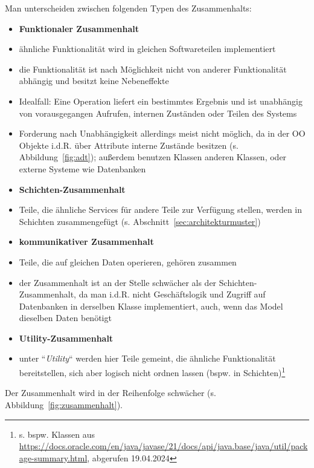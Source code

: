 Man unterscheiden zwischen folgenden Typen des Zusammenhalts:

\begin{itemize}
    \item \textbf{Funktionaler Zusammenhalt}
    \item[] ähnliche Funktionalität wird in gleichen Softwareteilen implementiert
    \item[] die Funktionalität ist nach Möglichkeit nicht von anderer Funktionalität abhängig und besitzt keine Nebeneffekte
    \item[] Idealfall: Eine Operation liefert ein bestimmtes Ergebnis und ist unabhängig von vorausgegangen Aufrufen, internen Zuständen oder Teilen des Systems
    \item[] Forderung nach Unabhängigkeit allerdings meist nicht möglich, da in der OO Objekte i.d.R. über Attribute interne Zustände besitzen (s. Abbildung~\ref{fig:adt}); außerdem benutzen Klassen anderen Klassen, oder externe Systeme wie Datenbanken
    \item \textbf{Schichten-Zusammenhalt}
    \item[] Teile, die ähnliche Services für andere Teile zur Verfügung stellen, werden in Schichten zusammengefügt (s. Abschnitt~\ref{sec:architekturmuster})
    \item \textbf{kommunikativer Zusammenhalt}
    \item[] Teile, die auf gleichen Daten operieren, gehören zusammen
    \item[] der Zusammenhalt ist an der Stelle schwächer als der Schichten-Zusammenhalt, da man i.d.R. nicht Geschäftslogik und Zugriff auf Datenbanken in derselben Klasse implementiert, auch, wenn das Model dieselben Daten benötigt
    \item \textbf{Utility-Zusammenhalt}
    \item[] unter ``\textit{Utility}`` werden hier Teile gemeint, die ähnliche Funktionalität bereitstellen, sich aber logisch nicht ordnen lassen (bspw. in Schichten)\footnote{s. bspw. Klassen aus \url{https://docs.oracle.com/en/java/javase/21/docs/api/java.base/java/util/package-summary.html}, abgerufen 19.04.2024}
\end{itemize}

\noindent
Der Zusammenhalt wird in der Reihenfolge schwächer (s. Abbildung~\ref{fig:zusammenhalt}).


